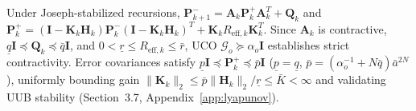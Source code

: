 \documentclass[balance,nocopyright,upint,varvw,hyphenate,barcolor=NavyBlue,nolists]{asmejour}
\begin{document}
Under Joseph-stabilized recursions, $\mathbf{P}_{k+1}^- = \mathbf{A}_k \mathbf{P}_k^+ \mathbf{A}_k^T + \mathbf{Q}_k$ and $\mathbf{P}_k^+ = (\mathbf{I} - \mathbf{K}_k \mathbf{H}_k)\mathbf{P}_k^-(\mathbf{I} - \mathbf{K}_k \mathbf{H}_k)^T + \mathbf{K}_k R_{\text{eff},k} \mathbf{K}_k^T$. Since $\mathbf{A}_k$ is contractive, $\underline{q}\mathbf{I} \preceq \mathbf{Q}_k \preceq \bar{q}\mathbf{I}$, and $0 < \underline{r} \le R_{\text{eff},k} \le \bar{r}$, UCO $\mathcal{G}_o \succeq \alpha_o \mathbf{I}$ establishes strict contractivity. Error covariances satisfy $\underline{p}\mathbf{I} \preceq \mathbf{P}_k^+ \preceq \bar{p}\mathbf{I}$ ($\underline{p} = \underline{q}$, $\bar{p} = (\alpha_o^{-1} + N\bar{q})\bar{a}^{2N}$), uniformly bounding gain $\|\mathbf{K}_k\|_2 \le \bar{p}\|\mathbf{H}_k\|_2/\underline{r} \le \bar{K} < \infty$ and validating UUB stability (Section~3.7, Appendix~\ref{app:lyapunov}).

\clearpage
\setlength{\bibsep}{0.0pt}


\end{document}
